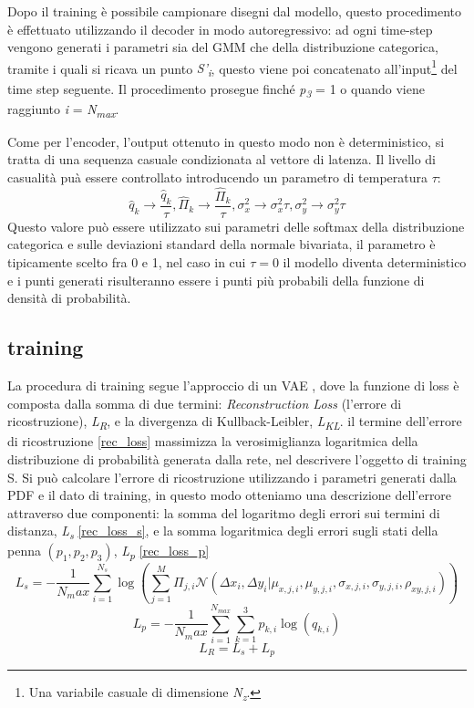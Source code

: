Dopo il training è possibile campionare disegni dal modello, questo procedimento è effettuato utilizzando il decoder in modo autoregressivo: ad ogni time-step vengono generati i parametri sia del GMM che della distribuzione categorica, tramite i quali si ricava un punto \textit{S'\textsubscript{i}}, questo viene poi concatenato all'input\footnote{Una variabile casuale di dimensione \textit{N\textsubscript{z}}.} del time step seguente. Il procedimento prosegue finché \textit{p\textsubscript{3}} = 1 o quando viene raggiunto \textit{i} = \textit{N\textsubscript{max}}.

Come per l'encoder, l'output ottenuto in questo modo non è deterministico, si tratta di una sequenza casuale condizionata al vettore di latenza. Il livello di casualità puà essere controllato introducendo un parametro di temperatura $\tau$:
\begin{equation}
	\label{temperature}
	\hat q_k \rightarrow \frac{\hat q_k}{\tau}, \hat \Pi_k \rightarrow \frac{\hat \Pi_k}{\tau}, \sigma_x^2 \rightarrow \sigma_x^2 \tau, \sigma_y^2 \rightarrow \sigma_y^2 \tau
\end{equation}
Questo valore può essere utilizzato sui parametri delle softmax della distribuzione categorica e sulle deviazioni standard della normale bivariata, il parametro è tipicamente scelto fra 0 e 1, nel caso in cui $\tau = 0$ il modello diventa deterministico e i punti generati risulteranno essere i punti più probabili della funzione di densità di probabilità.
\subsection{training} %
\label{sub:training}
La procedura di training segue l'approccio di un VAE \cite{VAE}, dove la funzione di loss è composta dalla somma di due termini: \textit{Reconstruction Loss} (l'errore di ricostruzione), \textit{L\textsubscript{R}}, e la divergenza di Kullback-Leibler, \textit{L\textsubscript{KL}}. il termine dell'errore di ricostruzione \ref{rec_loss} massimizza la verosimiglianza logaritmica della distribuzione di probabilità generata dalla rete, nel descrivere l'oggetto di training S. Si può calcolare l'errore di ricostruzione utilizzando i parametri generati dalla PDF e il dato di training, in questo modo otteniamo una descrizione dell'errore attraverso due componenti: la somma del logaritmo degli errori sui termini di distanza, \textit{L\textsubscript{s}} \ref{rec_loss_s}, e la somma logaritmica degli errori sugli stati della penna $(p_1, p_2, p_3)$, \textit{L\textsubscript{p}} \ref{rec_loss_p}
\begin{equation}
	\label{rec_loss_s}
	L_s = - \frac{1}{N_max}\sum_{i=1}^{N_s}\log(\sum_{j=1}^M \Pi_{j,i} \mathcal{N}(\Delta x_i, \Delta y_i | \mu_{x,j, i}, \mu_{y,j, i}, \sigma_{x,j, i}, \sigma_{y,j, i}, \rho_{xy, j, i}))
\end{equation}
\begin{equation}
	\label{rec_loss_p}
	L_p = - \frac{1}{N_max}\sum_{i=1}^{N_{max}}\sum_{k=1}^{3} p_{k, i}\log(q_{k, i})
\end{equation}
\begin{equation}
	\label{rec_loss}
	L_R = L_s + L_p
\end{equation}

